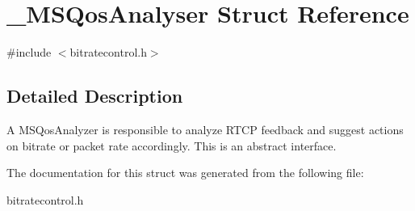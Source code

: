 \section{\-\_\-\-M\-S\-Qos\-Analyser Struct Reference}
\label{struct__MSQosAnalyser}


{\ttfamily \#include $<$bitratecontrol.\-h$>$}



\subsection{Detailed Description}
A M\-S\-Qos\-Analyzer is responsible to analyze R\-T\-C\-P feedback and suggest actions on bitrate or packet rate accordingly. This is an abstract interface. 

The documentation for this struct was generated from the following file\-:\begin{DoxyCompactItemize}
\item 
bitratecontrol.\-h\end{DoxyCompactItemize}
